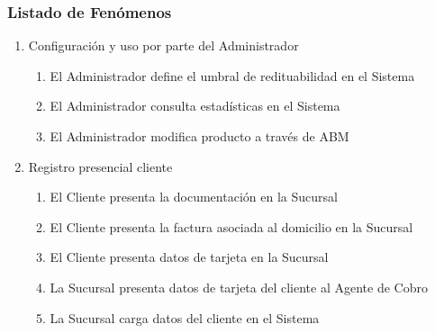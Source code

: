 \subsubsection{Listado de Fenómenos}
\begin{enumerate}
  \item Configuración y uso por parte del Administrador
  \begin{enumerate}
    \item El Administrador define el umbral de redituabilidad en el Sistema \label{itm:f-administrador-umbral-sistema}
    \item El Administrador consulta estadísticas en el Sistema \label{itm:f-administrador-estadistica-sistema}
    \item El Administrador modifica producto a través de ABM \label{itm:f-administrador-modifica-productos}
  \end{enumerate}

  \item Registro presencial cliente
  \begin{enumerate}
    \item El Cliente presenta la documentación en la Sucursal \label{itm:f-cliente-documentacion-sucursal}
    \item El Cliente presenta la factura asociada al domicilio en la Sucursal \label{itm:f-cliente-domicilio-sucursal}
    \item El Cliente presenta datos de tarjeta en la Sucursal \label{itm:f-cliente-tarjeta-sucursal}
    \item La Sucursal presenta datos de tarjeta del cliente al Agente de Cobro \label{itm:f-sucursal-tarjeta-agentecobro}
    \item La Sucursal carga datos del cliente en el Sistema \label{itm:f-sucursal-carga-cliente-sistema}
  \end{enumerate}


\end{enumerate}
